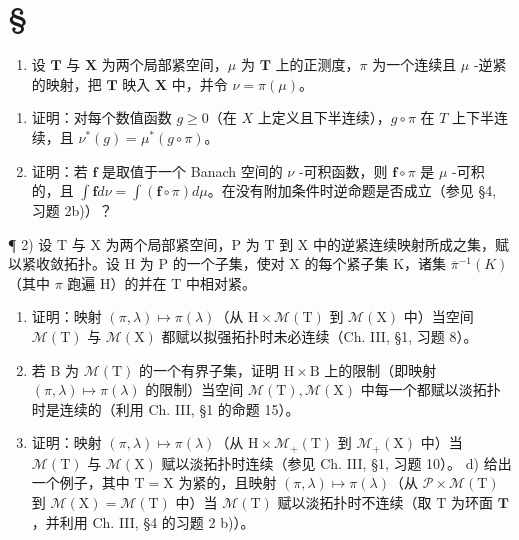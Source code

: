 \section*{\texorpdfstring{\S\CurrentExerciseGroup}{第{\CurrentExerciseGroup}节}}
{}

\begin{enumerate}
\def\labelenumi{\arabic{enumi})}
\tightlist
\item
  设 \(\mathbf{T}\) 与 \(\mathbf{X}\) 为两个局部紧空间，\(\mu\) 为 \(\mathbf{T}\) 上的正测度，\(\pi\) 为一个连续且 \(\mu\) -逆紧的映射，把 \(\mathbf{T}\) 映入 \(\mathbf{X}\) 中，并令 \(\nu = \pi(\mu)\)。
\end{enumerate}

\begin{enumerate}
\def\labelenumi{\alph{enumi})}
\item
  证明：对每个数值函数 \(g \geqslant 0\)（在 \(X\) 上定义且下半连续），\(g \circ \pi\) 在 \(T\) 上下半连续，且 \(\nu^{*}(g) = \mu^{*}(g \circ \pi)\)。
\item
  证明：若 \(\mathbf{f}\) 是取值于一个 Banach 空间的 \(\nu\) -可积函数，则 \(\mathbf{f} \circ \pi\) 是 \(\mu\) -可积的，且 \(\int \mathbf{f} d\nu = \int (\mathbf{f} \circ \pi) d\mu\)。在没有附加条件时逆命题是否成立（参见 §4, 习题 2b)）？
\end{enumerate}

¶ 2) 设 T 与 X 为两个局部紧空间，P 为 T 到 X 中的逆紧连续映射所成之集，赋以紧收敛拓扑。设 H 为 P 的一个子集，使对 X 的每个紧子集 K，诸集 \(\overline{\pi}^{-1}(K)\)（其中 \(\pi\) 跑遍 H）的并在 T 中相对紧。

\begin{enumerate}
\def\labelenumi{\alph{enumi})}
\item
  证明：映射 \((\pi, \lambda) \mapsto \pi(\lambda)\)（从 \(\mathrm{H} \times \mathcal{M}(\mathrm{T})\) 到 \(\mathcal{M}(\mathrm{X})\) 中）当空间 \(\mathcal{M}(\mathrm{T})\) 与 \(\mathcal{M}(\mathrm{X})\) 都赋以拟强拓扑时未必连续（Ch. III, §1, 习题 8）。
\item
  若 B 为 \(\mathcal{M}(\mathrm{T})\) 的一个有界子集，证明 \(\mathrm{H} \times \mathrm{B}\) 上的限制（即映射 \((\pi, \lambda) \mapsto \pi(\lambda)\) 的限制）当空间 \(\mathcal{M}(\mathrm{T}), \mathcal{M}(\mathrm{X})\) 中每一个都赋以淡拓扑时是连续的（利用 Ch. III, §1 的命题 15）。
\item
  证明：映射 \((\pi, \lambda) \mapsto \pi(\lambda)\)（从 \(\mathrm{H} \times \mathcal{M}_{+}(\mathrm{T})\) 到 \(\mathcal{M}_{+}(\mathrm{X})\) 中）当 \(\mathcal{M}(\mathrm{T})\) 与 \(\mathcal{M}(\mathrm{X})\) 赋以淡拓扑时连续（参见 Ch. III, §1, 习题 10）。 d) 给出一个例子，其中 \(\mathrm{T} = \mathrm{X}\) 为紧的，且映射 \((\pi, \lambda) \mapsto \pi(\lambda)\)（从 \(\mathcal{P} \times \mathcal{M}(\mathrm{T})\) 到 \(\mathcal{M}(\mathrm{X}) = \mathcal{M}(\mathrm{T})\) 中）当 \(\mathcal{M}(\mathrm{T})\) 赋以淡拓扑时不连续（取 \(\mathrm{T}\) 为环面 \(\mathbf{T}\)，并利用 Ch. III, §4 的习题 2 b)）。
\end{enumerate}

